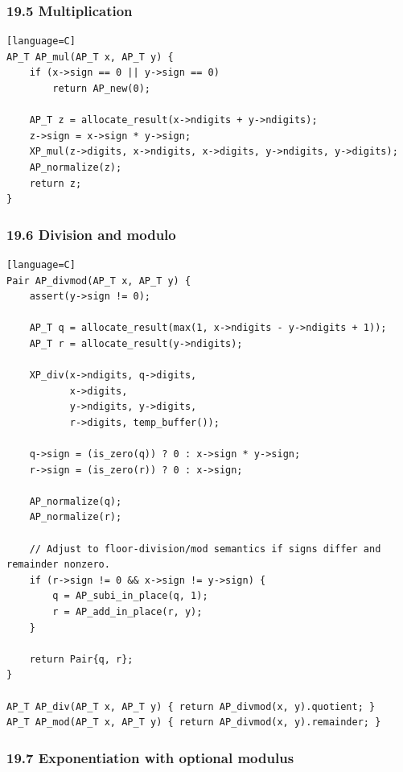 \documentclass[11pt]{article}
\begin{document}
\subsubsection{19.5 Multiplication}\label{multiplication-1}

\begin{verbatim}[language=C]
AP_T AP_mul(AP_T x, AP_T y) {
    if (x->sign == 0 || y->sign == 0)
        return AP_new(0);

    AP_T z = allocate_result(x->ndigits + y->ndigits);
    z->sign = x->sign * y->sign;
    XP_mul(z->digits, x->ndigits, x->digits, y->ndigits, y->digits);
    AP_normalize(z);
    return z;
}
\end{verbatim}

\subsubsection{19.6 Division and modulo}\label{division-and-modulo}

\begin{verbatim}[language=C]
Pair AP_divmod(AP_T x, AP_T y) {
    assert(y->sign != 0);

    AP_T q = allocate_result(max(1, x->ndigits - y->ndigits + 1));
    AP_T r = allocate_result(y->ndigits);

    XP_div(x->ndigits, q->digits,
           x->digits,
           y->ndigits, y->digits,
           r->digits, temp_buffer());

    q->sign = (is_zero(q)) ? 0 : x->sign * y->sign;
    r->sign = (is_zero(r)) ? 0 : x->sign;

    AP_normalize(q);
    AP_normalize(r);

    // Adjust to floor-division/mod semantics if signs differ and remainder nonzero.
    if (r->sign != 0 && x->sign != y->sign) {
        q = AP_subi_in_place(q, 1);
        r = AP_add_in_place(r, y);
    }

    return Pair{q, r};
}

AP_T AP_div(AP_T x, AP_T y) { return AP_divmod(x, y).quotient; }
AP_T AP_mod(AP_T x, AP_T y) { return AP_divmod(x, y).remainder; }
\end{verbatim}

\subsubsection{19.7 Exponentiation with optional modulus}\label{exponentiation-with-optional-modulus}
\end{document}

